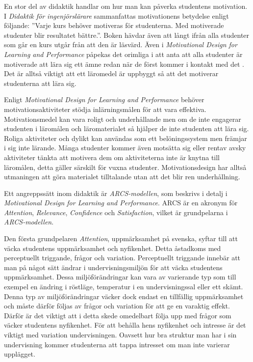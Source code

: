 \documentclass[]{article}
\begin{document}
En stor del av didaktik handlar om hur man kan påverka studentens
motivation. I \textit{Didaktik för ingenjörslärare} sammanfattas
motivationens betydelse enligt följande: ”Varje kurs behöver motiveras
för studenterna. Med motiverade studenter blir resultatet bättre.”.
Boken hävdar även att långt ifrån alla studenter som går en kurs utgår
från att den är läsvärd. Även i \textit{Motivational Design for
 Learning and Performance} påpekas det orimliga i att anta att alla
studenter är motiverade att lära sig ett ämne redan när de först
kommer i kontakt med det \cite{motivational_design}. Det är alltså viktigt att ett läromedel är
uppbyggt så att det motiverar studenterna att lära sig.

Enligt \textit{Motivational Design for Learning and Performance}
behöver motivations\-aktiviteter stödja inlärningsmålen för att vara
effektiva. Motivationsmedel kan vara roligt och underhållande men om
de inte engagerar studenten i läromålen och läromaterialet så hjälper
de inte studenten att lära sig. Roliga aktiviteter och dylikt kan
användas som ett belöningssystem men främjar i sig inte lärande. Många
studenter kommer även motsätta sig eller rentav avsky aktiviteter
tänkta att motivera dem om aktiviteterna inte är knytna till
läromålen, detta gäller särskilt för vuxna studenter.
Motivationsdesign har alltså utmaningen att göra materialet
tilltalande utan att det blir ren underhållning.

Ett angreppssätt inom didaktik är \textit{ARCS-modellen}, som beskrivs
i detalj i \textit{Motivational Design for Learning and Performance}.
ARCS är en akronym för \textit{Attention}, \textit{Relevance},
\textit{Confidence} och \textit{Satisfaction}, vilket är grundpelarna
i \textit{ARCS-modellen}.

Den första grundpelaren \textit{Attention}, uppmärksamhet på svenska,
syftar till att väcka studentens uppmärksamhet och nyfikenhet.
Detta åstadkoms med perceptuellt triggande, frågor och variation.
Perceptuellt triggande innebär att man på något sätt ändrar i
undervisningsmiljön för att väcka studentens uppmärksamhet. Dessa
miljöförändringar kan vara av varierande typ som till exempel en
ändring i röstläge, temperatur i en undervisningssal eller ett skämt.
Denna typ av miljöförändringar väcker dock endast en tillfällig
uppmärksamhet och måste därför följas av frågor och variation för att
ge en varaktig effekt. Därför är det viktigt att i detta skede
omedelbart följa upp med frågor som väcker studentens nyfikenhet. För
att behålla hens nyfikenhet och intresse är det viktigt med variation
undervisningen. Oavsett hur bra struktur man har i sin undervisning
kommer studenterna att tappa intresset om man inte varierar upplägget.
\end{document}
